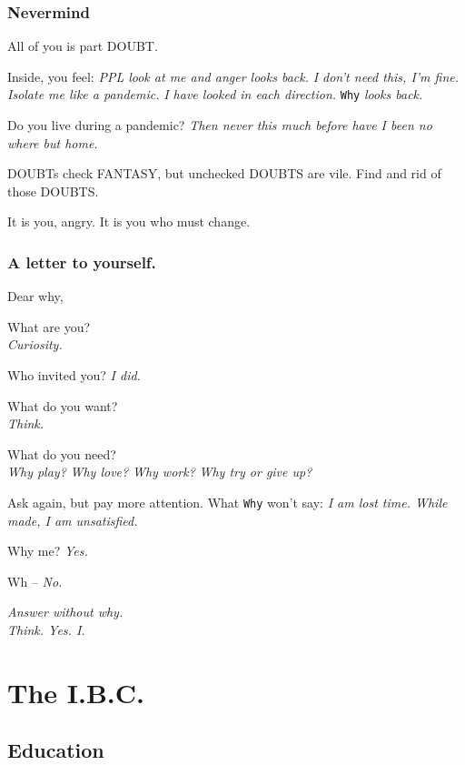 \documentclass[
]{book}
\begin{document}
\hypertarget{nevermind}{%
\section{Nevermind}\label{nevermind}}

All of you is part DOUBT.

Inside, you feel:
\emph{PPL look at me and anger looks back.}
\emph{I don't need this, I'm fine.}
\emph{Isolate me like a pandemic.}
\emph{I have looked in each direction.}
\texttt{Why} \emph{looks back.}

Do you live during a pandemic?
\emph{Then never this much before have I been no where but home.}

DOUBTs check FANTASY, but
unchecked DOUBTS are vile.
Find and rid of those DOUBTS.

It is you, angry.
It is you who must change.

\hypertarget{a-letter-to-yourself.}{%
\section{A letter to yourself.}\label{a-letter-to-yourself.}}

Dear why,

What are you?\\
\emph{Curiosity.}

Who invited you?
\emph{I did.}

What do you want?\\
\emph{Think.}

What do you need?\\
\emph{Why play?}
\emph{Why love?}
\emph{Why work?}
\emph{Why try or give up?}

Ask again, but pay more attention.
What \texttt{Why} won't say:
\emph{I am lost time. While made, I am unsatisfied.}

Why me?
\emph{Yes.}

Wh --
\emph{No.}

\emph{Answer without why.}\\
\emph{Think. Yes. I.}

\hypertarget{part-the-i.b.c.}{%
\part{The I.B.C.}\label{part-the-i.b.c.}}

\hypertarget{education}{%
\chapter{Education}\label{education}}
\end{document}

